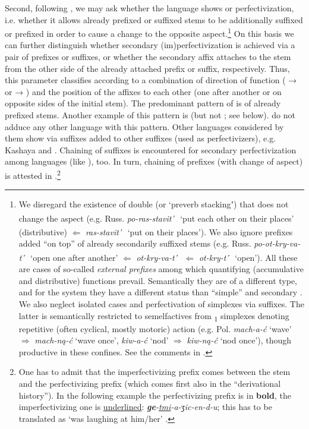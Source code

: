 \documentclass[output=paper]{langsci/langscibook}
\begin{document}
Second, following \citet{ArkadievShluinsky2015}, we may ask whether the language shows  or perfectivization, i.e. whether it allows already prefixed or suffixed stems to be additionally suffixed or prefixed in order to cause a change to the opposite aspect.\footnote{We disregard the existence of double  (or ‘preverb stackingʼ) that does not change the aspect (e.g. Russ. \textit{po-ras-stavit’}{\textsuperscript{~}\PFV} ‘put each other on their places’ (distributive) ${\Leftarrow}$ \textit{ras-stavit’}{\textsuperscript{~}\PFV} ‘put on their places’). We also ignore prefixes added “on top” of already secondarily suffixed stems (e.g. Russ. \textit{po-ot-kry-va-t’}{\textsuperscript{~}\PFV} ‘open one after another’ ${\Leftarrow}$ \textit{ot-kry-va-t’}{\textsuperscript{~}\IPFV} ${\Leftarrow}$ \textit{ot-kry-t’}{\textsuperscript{~}\PFV} ‘open’). All these are cases of so-called \textit{external prefixes} among which quantifying (accumulative and distributive) functions prevail. Semantically they are of a different type, and for the system they have a different status than “simple”  and secondary . We also neglect isolated cases and perfectivation of simplexes via suffixes. The latter is semantically restricted to semelfactives from \textsubscript{1} simplexes denoting repetitive (often cyclical, mostly motoric) action (e.g. Pol. \textit{mach-a-ć} ‘wave’ ${\Rightarrow}$ \textit{mach-ną-ć} ‘wave once’, \textit{kiw-a-ć} ‘nod’ ${\Rightarrow}$ \textit{kiw-ną-ć} ‘nod once’), though productive in these confines. See the comments in .} On this basis we can further distinguish whether secondary (im)perfectivization is achieved via a pair of prefixes or suffixes, or whether the secondary affix attaches to the stem from the other side of the already attached prefix or suffix, respectively. Thus, this parameter classifies according to a combination of direction of function ( →  or  → ) and the position of the affixes to each other (one after another or on opposite sides of the initial stem). The predominant  pattern of  is  of already prefixed stems. Another example of this pattern is  (but not ; see below). \citeauthor{ArkadievShluinsky2015} do not adduce any other language with this pattern. Other languages considered by them show  via suffixes added to other suffixes (used as perfectivizers), e.g. Kashaya and . Chaining of suffixes is encountered for secondary perfectivization among  languages (like ), too. In turn, chaining of prefixes (with change of aspect) is attested in .\footnote{One has to admit that the imperfectivizing prefix comes between the stem and the perfectivizing prefix (which comes first also in the “derivational history”). In the following  example the perfectivizing prefix is in \textbf{bold}, the imperfectivizing one is \uline{underlined}: \textit{\textbf{ge}-\uline{tmi}-a-ʒic-en-d-u}; this has to be translated as ‘was laughing at him/her’ \citep[391]{Arkadiev2014}.}
\end{document}
